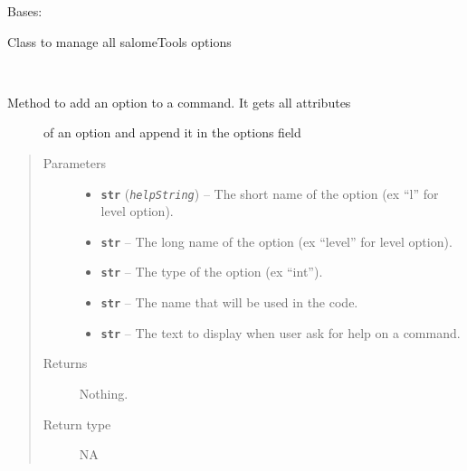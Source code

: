 \documentclass[a4paper,10pt,english]{sphinxmanual}
\begin{document}

\begin{fulllineitems}
\label{commands/apidoc/src:src.options.Options}
Bases: 

Class to manage all salomeTools options

\begin{fulllineitems}
\label{commands/apidoc/src:src.options.Options.add_option}~\begin{description}
\item[{Method to add an option to a command. It gets all attributes}] \leavevmode
of an option and append it in the options field

\end{description}
\begin{quote}\begin{description}
\item[{Parameters}] \leavevmode\begin{itemize}
\item {} 
\textbf{\texttt{str}} (\emph{\texttt{helpString}}) -- The short name of the option
(ex ``l'' for level option).

\item {} 
\textbf{\texttt{str}} -- The long name of the option 
(ex ``level'' for level option).

\item {} 
\textbf{\texttt{str}} -- The type of the option (ex ``int'').

\item {} 
\textbf{\texttt{str}} -- The name that will be used in the code.

\item {} 
\textbf{\texttt{str}} -- The text to display 
when user ask for help on a command.

\end{itemize}

\item[{Returns}] \leavevmode
Nothing.

\item[{Return type}] \leavevmode
NA

\end{description}\end{quote}


\end{fulllineitems}
\end{fulllineitems}
\end{document}

